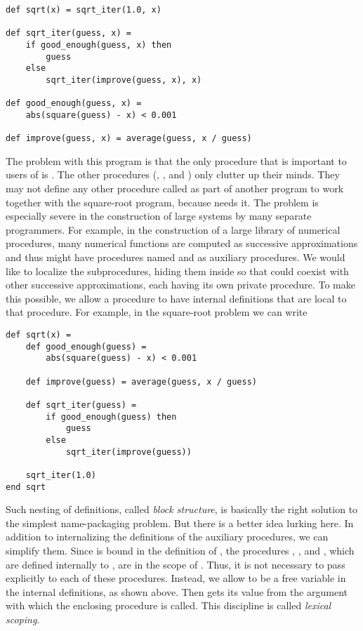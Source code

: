 \begin{lstlisting}
def sqrt(x) = sqrt_iter(1.0, x)

def sqrt_iter(guess, x) =
    if good_enough(guess, x) then
        guess
    else
        sqrt_iter(improve(guess, x), x)

def good_enough(guess, x) =
    abs(square(guess) - x) < 0.001

def improve(guess, x) = average(guess, x / guess)
\end{lstlisting}

The problem with this program is that the only procedure that is important to users of  is . The other procedures (, , and ) only clutter up their minds. They may not define any other procedure called  as part of another program to work together with the square-root program, because  needs it. The problem is especially severe in the construction of large systems by many separate programmers. For example, in the construction of a large library of numerical procedures, many numerical functions are computed as successive approximations and thus might have procedures named  and  as auxiliary procedures. We would like to localize the subprocedures, hiding them inside  so that  could coexist with other successive approximations, each having its own private  procedure. To make this possible, we allow a procedure to have internal definitions that are local to that procedure. For example, in the square-root problem we can write

\begin{lstlisting}
def sqrt(x) =
    def good_enough(guess) =
        abs(square(guess) - x) < 0.001
    
    def improve(guess) = average(guess, x / guess)
    
    def sqrt_iter(guess) =
        if good_enough(guess) then
            guess
        else
            sqrt_iter(improve(guess))
    
    sqrt_iter(1.0)
end sqrt
\end{lstlisting}

Such nesting of definitions, called \textit{block structure}, is basically the right solution to the simplest name-packaging problem. But there is a better idea lurking here. In addition to internalizing the definitions of the auxiliary procedures, we can simplify them. Since  is bound in the definition of , the procedures , , and , which are defined internally to , are in the scope of . Thus, it is not necessary to pass  explicitly to each of these procedures. Instead, we allow  to be a free variable in the internal definitions, as shown above. Then  gets its value from the argument with which the enclosing procedure  is called. This discipline is called \textit{lexical scoping}.

